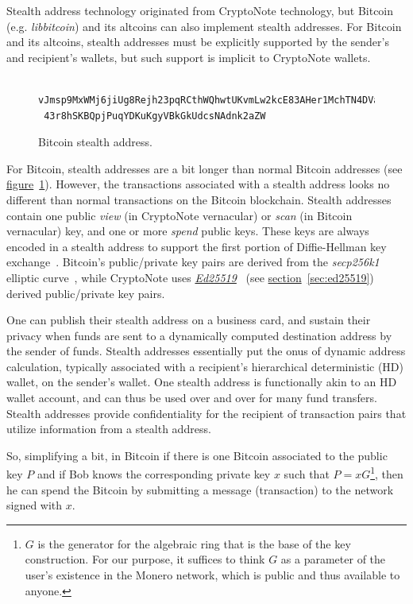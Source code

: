 Stealth address technology originated from CryptoNote technology, but Bitcoin (e.g. \emph{libbitcoin}) and its altcoins can also implement stealth addresses. For Bitcoin and its altcoins, stealth addresses must be explicitly supported by the sender's and recipient's wallets, but such support is implicit to CryptoNote wallets.
\begin{figure}
  \begin{verbatim}
 vJmsp9MxWMj6jiUg8Rejh23pqRCthWQhwtUKvmLw2kcE83AHer1MchTN4DVacHt
 43r8hSKBQpjPuqYDKuKgyVBkGkUdcsNAdnk2aZW
  \end{verbatim}
  \caption{Bitcoin stealth address.}
  \label{fig:btcstealth}
\end{figure}

For Bitcoin, stealth addresses are a bit longer than normal Bitcoin addresses (see \hyperref[fig:btcstealth]{figure}~\ref{fig:btcstealth}). However, the transactions associated with a stealth address looks no different than normal transactions on the Bitcoin blockchain. Stealth addresses contain one public \emph{view} (in CryptoNote vernacular) or \emph{scan} (in Bitcoin vernacular) key, and one or more \emph{spend} public keys. These keys are always encoded in a stealth address to support the first portion of Diffie-Hellman key exchange~\cite{Diffie:2006:NDC:2263321.2269104}. Bitcoin's public/private key pairs are derived from the \emph{secp256k1} elliptic curve~\cite{secg}, while CryptoNote uses \hyperref[sec:ed25519]{\emph{Ed25519}}~\cite{curve25519} (see \hyperref[sec:ed25519]{section}~\ref{sec:ed25519}) derived public/private key pairs.

One can publish their stealth address on a business card, and sustain their privacy when funds are sent to a dynamically computed destination address by the sender of funds. Stealth addresses essentially put the onus of dynamic address calculation, typically associated with a recipient's hierarchical deterministic (HD) wallet, on the sender's wallet. One stealth address is functionally akin to an HD wallet account, and can thus be used over and over for many fund transfers. Stealth addresses provide confidentiality for the recipient of transaction pairs that utilize information from a stealth address.

So, simplifying a bit, in Bitcoin if there is one Bitcoin associated to the public key $P$ and if Bob knows the corresponding private key $x$ such that $P = xG$\footnote{$G$ is the generator for the algebraic ring that is the base of the key construction. For our purpose, it suffices to think $G$ as a parameter of the user's existence in the Monero network, which is public and thus available to anyone.}, then he can spend the Bitcoin by submitting a message (transaction) to the network signed with $x$.

